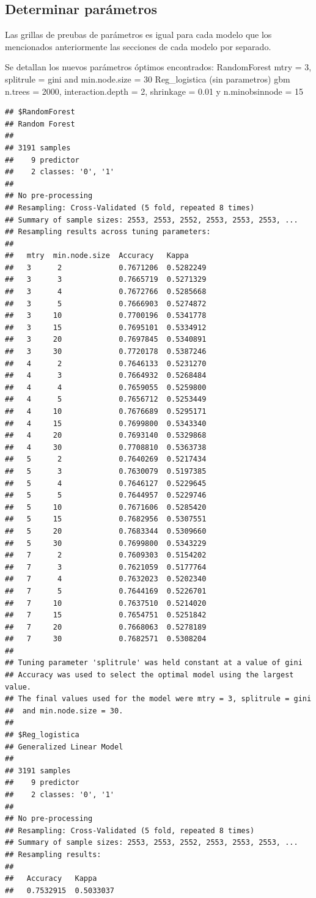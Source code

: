 \documentclass[]{article}
\begin{document}
\hypertarget{determinar-paruxe1metros-2}{%
\subsection{Determinar parámetros}\label{determinar-paruxe1metros-2}}

Las grillas de preubas de parámetros es igual para cada modelo que los
mencionados anteriormente las secciones de cada modelo por separado.

Se detallan los nuevos parámetros óptimos encontrados: RandomForest mtry
= 3, splitrule = gini and min.node.size = 30 Reg\_logistica (sin
parametros) gbm n.trees = 2000, interaction.depth = 2, shrinkage = 0.01
y n.minobsinnode = 15

\begin{lstlisting}
## $RandomForest
## Random Forest 
## 
## 3191 samples
##    9 predictor
##    2 classes: '0', '1' 
## 
## No pre-processing
## Resampling: Cross-Validated (5 fold, repeated 8 times) 
## Summary of sample sizes: 2553, 2553, 2552, 2553, 2553, 2553, ... 
## Resampling results across tuning parameters:
## 
##   mtry  min.node.size  Accuracy   Kappa    
##   3      2             0.7671206  0.5282249
##   3      3             0.7665719  0.5271329
##   3      4             0.7672766  0.5285668
##   3      5             0.7666903  0.5274872
##   3     10             0.7700196  0.5341778
##   3     15             0.7695101  0.5334912
##   3     20             0.7697845  0.5340891
##   3     30             0.7720178  0.5387246
##   4      2             0.7646133  0.5231270
##   4      3             0.7664932  0.5268484
##   4      4             0.7659055  0.5259800
##   4      5             0.7656712  0.5253449
##   4     10             0.7676689  0.5295171
##   4     15             0.7699800  0.5343340
##   4     20             0.7693140  0.5329868
##   4     30             0.7708810  0.5363738
##   5      2             0.7640269  0.5217434
##   5      3             0.7630079  0.5197385
##   5      4             0.7646127  0.5229645
##   5      5             0.7644957  0.5229746
##   5     10             0.7671606  0.5285420
##   5     15             0.7682956  0.5307551
##   5     20             0.7683344  0.5309660
##   5     30             0.7699800  0.5343229
##   7      2             0.7609303  0.5154202
##   7      3             0.7621059  0.5177764
##   7      4             0.7632023  0.5202340
##   7      5             0.7644169  0.5226701
##   7     10             0.7637510  0.5214020
##   7     15             0.7654751  0.5251842
##   7     20             0.7668063  0.5278189
##   7     30             0.7682571  0.5308204
## 
## Tuning parameter 'splitrule' was held constant at a value of gini
## Accuracy was used to select the optimal model using the largest value.
## The final values used for the model were mtry = 3, splitrule = gini
##  and min.node.size = 30.
## 
## $Reg_logistica
## Generalized Linear Model 
## 
## 3191 samples
##    9 predictor
##    2 classes: '0', '1' 
## 
## No pre-processing
## Resampling: Cross-Validated (5 fold, repeated 8 times) 
## Summary of sample sizes: 2553, 2553, 2552, 2553, 2553, 2553, ... 
## Resampling results:
## 
##   Accuracy   Kappa    
##   0.7532915  0.5033037
\end{lstlisting}
\end{document}

